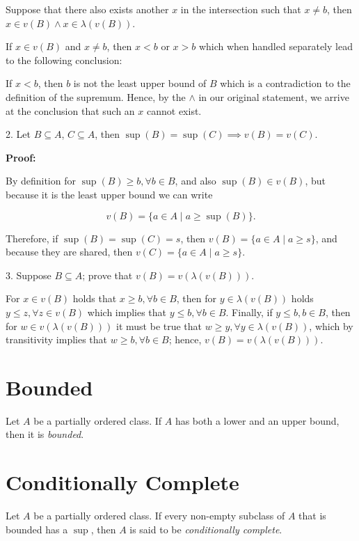 Suppose that there also exists another \(x\) in the intersection such that \(x \ne b\), then \(x \in v(B) \land x \in \lambda(v(B))\).

If \(x \in v(B)\) and \(x \ne b\), then \(x < b\) or \(x > b\) which when handled separately lead to the following conclusion:

If \(x < b\), then \(b\) is not the least upper bound of \(B\) which is a contradiction to the definition of the supremum. Hence, by the \(\land\) in our original
statement, we arrive at the conclusion that such an \(x\) cannot exist.

\QED

2. Let \(B \subseteq A\), \(C \subseteq A\), then \(\sup(B) = \sup(C) \implies v(B) = v(C)\).

\textbf{Proof:}

By definition for \(\sup(B) \ge b, \forall b \in B\), and also \(\sup(B) \in v(B)\), but because it is the least upper bound we can write

\[
	v(B) = \{a \in A \mid a \ge \sup(B)\}.
\]

Therefore, if \(\sup(B) = \sup(C) = s\), then \(v(B) = \{a \in A \mid a \ge s\}\), and because they are shared, then
\(v(C) = \{a \in A \mid a \ge s\}\).

\QED

3. Suppose \(B \subseteq A\); prove that \(v(B) = v(\lambda(v(B)))\).

For \(x \in v(B)\) holds that \(x \ge b, \forall b \in B\), then for \(y \in \lambda(v(B))\) holds \(y \le z, \forall z \in v(B)\) which
implies that \(y \le b, \forall b \in B\). Finally, if \(y \le b, b \in B\), then for \(w \in v(\lambda(v(B)))\) it must be true that
\(w \ge y, \forall y \in \lambda(v(B))\), which by transitivity implies that \(w \ge b, \forall b \in B\); hence, \(v(B) = v(\lambda(v(B)))\).

\QED

\section{Bounded}

Let \(A\) be a partially ordered class. If \(A\) has both a lower and an upper bound, then it is \emph{bounded}.

\section{Conditionally Complete}

Let \(A\) be a partially ordered class. If every non-empty subclass of \(A\) that is bounded has a \(\sup\), then \(A\)
is said to be \emph{conditionally complete}.

